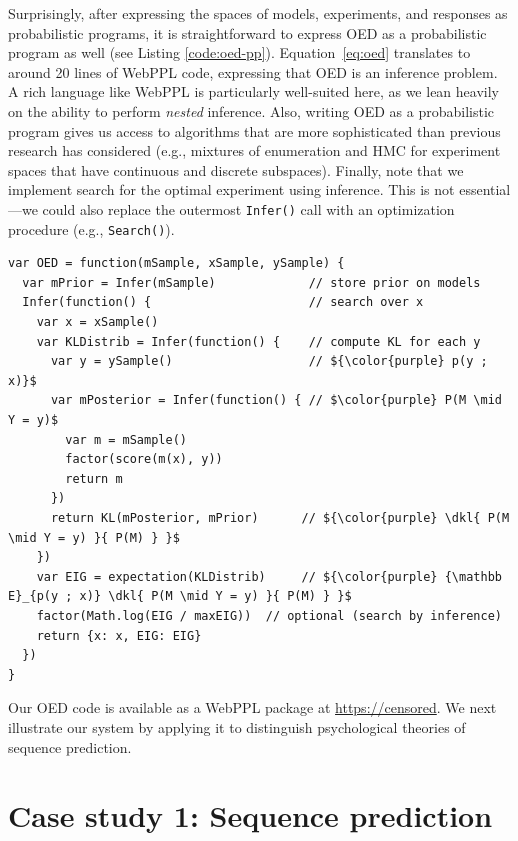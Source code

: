 \documentclass{article}
\newcommand{\dkl}{D_\mathrm{KL}\infdivx}
\newcommand{\ndg}[1]{\textcolor{Green}{[ndg: #1]}}
\begin{document}
Surprisingly, after expressing the spaces of models, experiments, and responses as probabilistic programs, it is straightforward to express OED as a probabilistic program as well (see Listing \ref{code:oed-pp}).
Equation~\ref{eq:oed} translates to around 20 lines of WebPPL code, expressing that OED is an inference problem.
A rich language like WebPPL is particularly well-suited here, as we lean heavily on the ability to perform \emph{nested} inference.
Also, writing OED as a probabilistic program gives us access to algorithms that are more sophisticated than previous research has considered (e.g., mixtures of enumeration and HMC for experiment spaces that have continuous and discrete subspaces).
Finally, note that we implement search for the optimal experiment using inference.
This is not essential---we could also replace the outermost \lstinline|Infer()| call with an optimization procedure (e.g., \lstinline|Search()|).

\begin{lstlisting}[mathescape, label={code:oed-pp}, caption = {OED implementation. For clarity, we have omitted some book-keeping details.}]
var OED = function(mSample, xSample, ySample) {
  var mPrior = Infer(mSample)             // store prior on models
  Infer(function() {                      // search over x
    var x = xSample()
    var KLDistrib = Infer(function() {    // compute KL for each y
      var y = ySample()                   // ${\color{purple} p(y ; x)}$
      var mPosterior = Infer(function() { // $\color{purple} P(M \mid Y = y)$
        var m = mSample()
        factor(score(m(x), y))
        return m
      })
      return KL(mPosterior, mPrior)      // ${\color{purple} \dkl{ P(M \mid Y = y) }{ P(M) } }$
    })
    var EIG = expectation(KLDistrib)     // ${\color{purple} {\mathbb E}_{p(y ; x)} \dkl{ P(M \mid Y = y) }{ P(M) } }$
    factor(Math.log(EIG / maxEIG))  // optional (search by inference)
    return {x: x, EIG: EIG}
  })
}
\end{lstlisting}
Our OED code is available as a WebPPL package at \url{https://censored}. %
We next illustrate our system by applying it to distinguish psychological theories of sequence prediction.

\section{Case study 1: Sequence prediction}
\label{s:tutorial}
\end{document}
